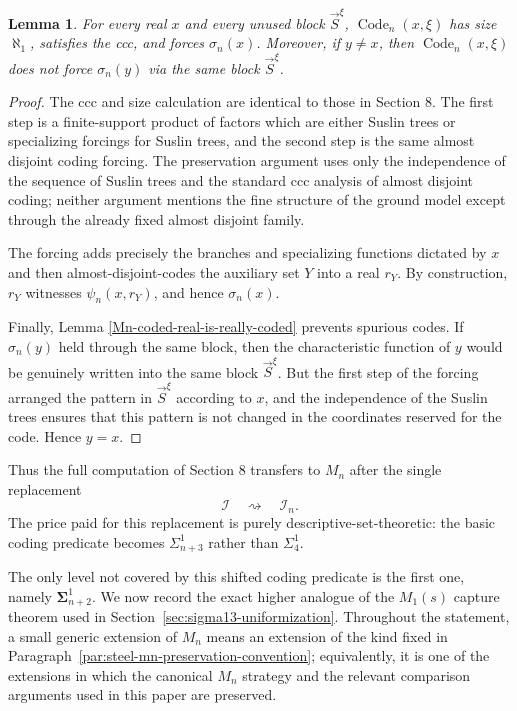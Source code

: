 \documentclass[a4paper,11pt]{article}
\newtheorem{lemma}[theorem]{Lemma}
\begin{document}
\begin{lemma}\label{Mn-Code-properties}
For every real $x$ and every unused block $\vec S^\xi$,
$\operatorname{Code}_n(x,\xi)$ has size $\aleph_1$, satisfies the ccc, and
forces $\sigma_n(x)$. Moreover, if $y\neq x$, then
$\operatorname{Code}_n(x,\xi)$ does not force $\sigma_n(y)$ via the same
block $\vec S^\xi$.
\end{lemma}

\begin{proof}
The ccc and size calculation are identical to those in Section 8. The first
step is a finite-support product of factors which are either Suslin trees or
specializing forcings for Suslin trees, and the second step is the same
almost disjoint coding forcing. The preservation argument uses only the
independence of the sequence of Suslin trees and the standard ccc analysis of
almost disjoint coding; neither argument mentions the fine structure of the
ground model except through the already fixed almost disjoint family.

The forcing adds precisely the branches and specializing functions dictated
by $x$ and then almost-disjoint-codes the auxiliary set $Y$ into a real
$r_Y$. By construction, $r_Y$ witnesses $\psi_n(x,r_Y)$, and hence
$\sigma_n(x)$.

Finally, Lemma \ref{Mn-coded-real-is-really-coded} prevents spurious codes.
If $\sigma_n(y)$ held through the same block, then the characteristic
function of $y$ would be genuinely written into the same block
$\vec S^\xi$. But the first step of the forcing arranged the pattern in
$\vec S^\xi$ according to $x$, and the independence of the Suslin trees
ensures that this pattern is not changed in the coordinates reserved for the
code. Hence $y=x$.
\end{proof}

Thus the full computation of Section 8 transfers to $M_n$ after the single
replacement
\[
\mathcal I\quad\rightsquigarrow\quad \mathcal I_n.
\]
The price paid for this replacement is purely descriptive-set-theoretic:
the basic coding predicate becomes $\Sigma^1_{n+3}$ rather than
$\Sigma^1_4$.

The only level not covered by this shifted coding predicate is the first one,
namely $\boldsymbol{\Sigma}^1_{n+2}$.  We now record the exact higher analogue
of the $M_1(s)$ capture theorem used in
Section~\ref{sec:sigma13-uniformization}.  Throughout the statement, a small
generic extension of $M_n$ means an extension of the kind fixed in
Paragraph~\ref{par:steel-mn-preservation-convention}; equivalently, it is one
of the extensions in which the canonical $M_n$ strategy and the relevant
comparison arguments used in this paper are preserved.
\end{document}
